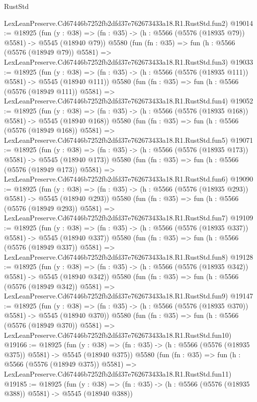 \begin{lexlean}{RustStd}
\begin{coremodule}
    LexLeanPreserve.Cd67446b7252fb2dfd37e762673433a18.R1.RustStd.fun2)
@19014 := @18925
    (fun (y : @38) => (fn : @35) -> (h : @5566 (@5576 (@18935 @79)) @5581) -> @5545 (@18940 @79))
    @5580
    (fun (fn : @35) =>
    fun (h : @5566 (@5576 (@18949 @79)) @5581) =>
    LexLeanPreserve.Cd67446b7252fb2dfd37e762673433a18.R1.RustStd.fun3)
@19033 := @18925
    (fun (y : @38) => (fn : @35) -> (h : @5566 (@5576 (@18935 @111)) @5581) -> @5545 (@18940 @111))
    @5580
    (fun (fn : @35) =>
    fun (h : @5566 (@5576 (@18949 @111)) @5581) =>
    LexLeanPreserve.Cd67446b7252fb2dfd37e762673433a18.R1.RustStd.fun4)
@19052 := @18925
    (fun (y : @38) => (fn : @35) -> (h : @5566 (@5576 (@18935 @168)) @5581) -> @5545 (@18940 @168))
    @5580
    (fun (fn : @35) =>
    fun (h : @5566 (@5576 (@18949 @168)) @5581) =>
    LexLeanPreserve.Cd67446b7252fb2dfd37e762673433a18.R1.RustStd.fun5)
@19071 := @18925
    (fun (y : @38) => (fn : @35) -> (h : @5566 (@5576 (@18935 @173)) @5581) -> @5545 (@18940 @173))
    @5580
    (fun (fn : @35) =>
    fun (h : @5566 (@5576 (@18949 @173)) @5581) =>
    LexLeanPreserve.Cd67446b7252fb2dfd37e762673433a18.R1.RustStd.fun6)
@19090 := @18925
    (fun (y : @38) => (fn : @35) -> (h : @5566 (@5576 (@18935 @293)) @5581) -> @5545 (@18940 @293))
    @5580
    (fun (fn : @35) =>
    fun (h : @5566 (@5576 (@18949 @293)) @5581) =>
    LexLeanPreserve.Cd67446b7252fb2dfd37e762673433a18.R1.RustStd.fun7)
@19109 := @18925
    (fun (y : @38) => (fn : @35) -> (h : @5566 (@5576 (@18935 @337)) @5581) -> @5545 (@18940 @337))
    @5580
    (fun (fn : @35) =>
    fun (h : @5566 (@5576 (@18949 @337)) @5581) =>
    LexLeanPreserve.Cd67446b7252fb2dfd37e762673433a18.R1.RustStd.fun8)
@19128 := @18925
    (fun (y : @38) => (fn : @35) -> (h : @5566 (@5576 (@18935 @342)) @5581) -> @5545 (@18940 @342))
    @5580
    (fun (fn : @35) =>
    fun (h : @5566 (@5576 (@18949 @342)) @5581) =>
    LexLeanPreserve.Cd67446b7252fb2dfd37e762673433a18.R1.RustStd.fun9)
@19147 := @18925
    (fun (y : @38) => (fn : @35) -> (h : @5566 (@5576 (@18935 @370)) @5581) -> @5545 (@18940 @370))
    @5580
    (fun (fn : @35) =>
    fun (h : @5566 (@5576 (@18949 @370)) @5581) =>
    LexLeanPreserve.Cd67446b7252fb2dfd37e762673433a18.R1.RustStd.fun10)
@19166 := @18925
    (fun (y : @38) => (fn : @35) -> (h : @5566 (@5576 (@18935 @375)) @5581) -> @5545 (@18940 @375))
    @5580
    (fun (fn : @35) =>
    fun (h : @5566 (@5576 (@18949 @375)) @5581) =>
    LexLeanPreserve.Cd67446b7252fb2dfd37e762673433a18.R1.RustStd.fun11)
@19185 := @18925
    (fun (y : @38) => (fn : @35) -> (h : @5566 (@5576 (@18935 @388)) @5581) -> @5545 (@18940 @388))

\end{coremodule}
\end{lexlean}
